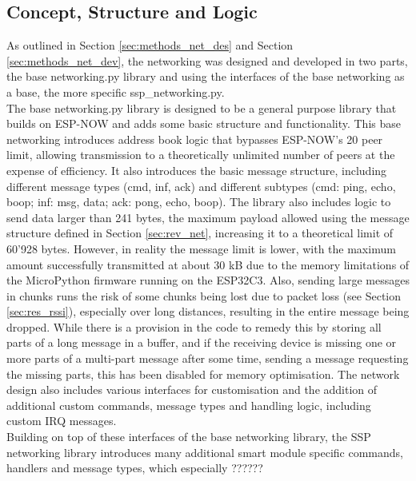 \subsection{\label{sec:res_logic}Concept, Structure and Logic}

As outlined in Section \ref{sec:methods_net_des} and Section \ref{sec:methods_net_dev}, the networking was designed and developed in two parts, the base networking.py library and using the interfaces of the base networking as a base, the more specific ssp\_networking.py. \\

The base networking.py library is designed to be a general purpose library that builds on ESP-NOW and adds some basic structure and functionality. This base networking introduces address book logic that bypasses ESP-NOW's 20 peer limit, allowing transmission to a theoretically unlimited number of peers at the expense of efficiency. It also introduces the basic message structure, including different message types (cmd, inf, ack) and different subtypes (cmd: ping, echo, boop; inf: msg, data; ack: pong, echo, boop). The library also includes logic to send data larger than 241 bytes, the maximum payload allowed using the message structure defined in Section \ref{sec:rev_net}, increasing it to a theoretical limit of 60'928 bytes. However, in reality the message limit is lower, with the maximum amount successfully transmitted at about 30 kB due to the memory limitations of the MicroPython firmware running on the ESP32C3. Also, sending large messages in chunks runs the risk of some chunks being lost due to packet loss (see Section \ref{sec:res_rssi}), especially over long distances, resulting in the entire message being dropped. While there is a provision in the code to remedy this by storing all parts of a long message in a buffer, and if the receiving device is missing one or more parts of a multi-part message after some time, sending a message requesting the missing parts, this has been disabled for memory optimisation. 
The network design also includes various interfaces for customisation and the addition of additional custom commands, message types and handling logic, including custom IRQ messages. \\

Building on top of these interfaces of the base networking library, the SSP networking library introduces many additional smart module specific commands, handlers and message types, which especially ??????



